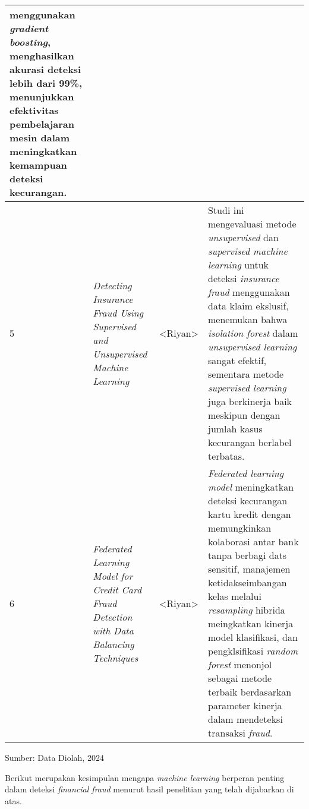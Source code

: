 \documentclass[12pt, a4paper]{article}
\begin{document}
\begin{center}
\begin{longtable}{|p{0.5cm}|p{3cm}|p{2.5cm}|p{5cm}|}
        menggunakan \textit{gradient boosting}, menghasilkan akurasi deteksi lebih dari 99\%,
        menunjukkan efektivitas pembelajaran mesin dalam meningkatkan kemampuan deteksi kecurangan. \\
        \hline
        5 & \textit{Detecting Insurance Fraud Using Supervised and Unsupervised Machine Learning} &
        <Riyan> &
        Studi ini mengevaluasi metode \textit{unsupervised} dan \textit{supervised machine learning} untuk deteksi 
        \textit{insurance fraud} menggunakan data klaim ekslusif, menemukan bahwa \textit{isolation forest} dalam
        \textit{unsupervised learning} sangat efektif, sementara metode \textit{supervised learning}
        juga berkinerja baik meskipun dengan jumlah kasus kecurangan berlabel terbatas.\\
        \hline
        6 & \textit{Federated  Learning Model  for  Credit Card Fraud Detection  with  Data Balancing Techniques} &
        <Riyan> &
        \textit{Federated learning model} meningkatkan deteksi kecurangan kartu kredit dengan memungkinkan kolaborasi
        antar bank tanpa berbagi dats sensitif, manajemen ketidakseimbangan kelas melalui \textit{resampling}
        hibrida meingkatkan kinerja model klasifikasi, dan pengklsifikasi \textit{random forest}
        menonjol sebagai metode terbaik berdasarkan parameter kinerja dalam mendeteksi transaksi \textit{fraud}.\\
        \hline
    \end{longtable}
\end{center}

\begin{flushleft}
Sumber: Data Diolah, 2024
\end{flushleft}

Berikut merupakan kesimpulan mengapa \textit{machine learning} berperan penting dalam deteksi
\textit{financial fraud} menurut hasil penelitian yang telah dijabarkan di atas.
\end{document}
